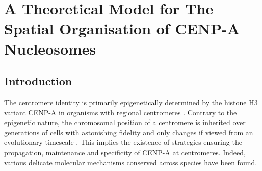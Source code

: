\chapter{A Theoretical Model for The Spatial Organisation of CENP-A Nucleosomes}
\section{Introduction}

The centromere identity is primarily epigenetically determined by the histone H3 variant CENP-A in organisms with regional centromeres \citep{Warburton1997ImmunolocalizationCentromeres, Vafa1997ChromatinPlate, Earnshaw1985ThreeChromosome, Liu2006MappingCells, Regnier2005CENP-ABubR1, Heun2006, Mendiburo2011, Barnhart2011, Logsdon2015, Logsdon2019}. Contrary to the epigenetic nature, the chromosomal position of a centromere is inherited over generations of cells with astonishing fidelity and only changes if viewed from an evolutionary timescale \citep{Amor2004HumanProgress, Murphy2005DynamicsMaps}. This implies the existence of strategies ensuring the propagation, maintenance and specificity of CENP-A at centromeres. Indeed, various delicate molecular mechanisms conserved across species have been found. 

